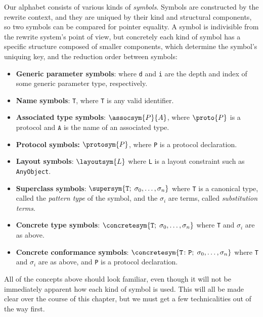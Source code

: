 \documentclass[../generics]{subfiles}
\begin{document}
%
%
%
%
%
%
%
%
%
%
%
%
%
%
%
%
%
%
Our alphabet consists of various kinds of \emph{symbols}. Symbols are constructed by the rewrite context, and they are uniqued by their kind and structural components, so two symbols can be compared for pointer equality. A symbol is indivisible from the rewrite system's point of view, but concretely each kind of symbol has a specific structure composed of smaller components, which determine the symbol's uniquing key, and the reduction order between symbols:
\begin{itemize}
\item \textbf{Generic parameter symbols}:  where \texttt{d} and \texttt{i} are the depth and index of some generic parameter type, respectively.
\item \textbf{Name symbols}: \texttt{T}, where \texttt{T} is any valid identifier.
\item \textbf{Associated type symbols}: $\assocsym{P}{A}$, where $\proto{P}$ is a protocol and $\texttt{A}$ is the name of an associated type.
\item \textbf{Protocol symbols:} $\protosym{P}$, where \texttt{P} is a protocol declaration.
\item \textbf{Layout symbols}: $\layoutsym{L}$ where \texttt{L} is a layout constraint such as \texttt{AnyObject}.
\item \textbf{Superclass symbols}: $\supersym{\texttt{T};\;\sigma_0,\ldots,\sigma_n}$ where \texttt{T} is a canonical type, called the \emph{pattern type} of the symbol, and the $\sigma_i$ are terms, called \emph{substitution terms}.
\item \textbf{Concrete type symbols}: $\concretesym{\texttt{T};\;\sigma_0,\ldots,\sigma_n}$ where \texttt{T} and $\sigma_i$ are as above.
\item \textbf{Concrete conformance symbols}: $\concretesym{\texttt{T}\colon\texttt{P};\;\sigma_0,\ldots,\sigma_n}$ where \texttt{T} and $\sigma_i$ are as above, and \texttt{P} is a protocol declaration.
\end{itemize}
All of the concepts above should look familiar, even though it will not be immediately apparent how each kind of symbol is used. This will all be made clear over the course of this chapter, but we must get a few technicalities out of the way first.
\end{document}
